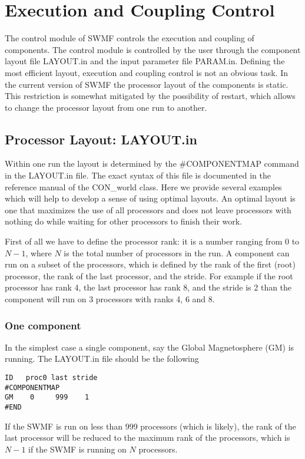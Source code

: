 \section{Execution and Coupling Control}

The control module of SWMF controls the execution and coupling of
components. The control module is controlled by the user through the
component layout file LAYOUT.in and the input parameter file PARAM.in.
Defining the most efficient layout, execution and coupling control
is not an obvious task. In the current version of SWMF the processor
layout of the components is static. This restriction is somewhat
mitigated by the possibility of restart, which allows to change
the processor layout from one run to another.

\subsection{Processor Layout: LAYOUT.in}

Within one run the layout is determined by the \#COMPONENTMAP
command in the LAYOUT.in file. The exact syntax of this file
is documented in the reference manual of the CON\_world class.
Here we provide several examples which will help to develop
a sense of using optimal layouts.  An optimal layout is one that 
maximizes the use of all processors and does not leave processors
with nothing do while waiting for other processors to finish their work.

First of all we have to define the processor rank:
it is a number ranging from 0 to $N-1$, where
$N$ is the total number of processors in the run. 
A component can run on a subset of the processors,
which is defined by the rank of the first (root) processor,
the rank of the last processor, and the stride. For
example if the root processor has rank 4, the last processor
has rank 8, and the stride is 2 than the component will
run on 3 processors with ranks 4, 6 and 8.

\subsubsection{One component}

In the simplest case a single component, say the Global
Magnetosphere (GM) is running. The LAYOUT.in file should be
the following
\begin{verbatim}
ID   proc0 last stride
#COMPONENTMAP
GM    0     999    1
#END
\end{verbatim}
If the SWMF is run on less than 999 processors (which is likely),
the rank of the last processor will be reduced to the maximum
rank of the processors, which is $N-1$ if the SWMF is running on $N$
processors.

